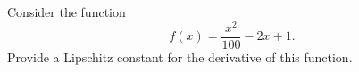 
Consider the function
\[
f(x) = \frac{x^2}{100} -2x + 1.
\]
Provide a Lipschitz constant for the derivative of this function.



